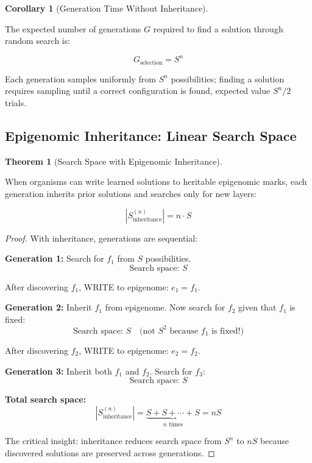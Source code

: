 \documentclass[11pt]{article}
\theoremstyle{definition}
\newtheorem{theorem}{Theorem}
\newtheorem{corollary}{Corollary}
\begin{document}
\begin{corollary}[Generation Time Without Inheritance]
\label{cor:gen-time-selection}

The expected number of generations $G$ required to find a solution through random search is:

\begin{equation}
G_{\text{selection}} = S^n
\end{equation}

Each generation samples uniformly from $S^n$ possibilities; finding a solution requires sampling until a correct configuration is found, expected value $S^n/2$ trials.

\end{corollary}

\subsection{Epigenomic Inheritance: Linear Search Space}

\begin{theorem}[Search Space with Epigenomic Inheritance]
\label{thm:inheritance-space}

When organisms can write learned solutions to heritable epigenomic marks, each generation inherits prior solutions and searches only for new layers:

\begin{equation}
|S^{(n)}_{\text{inheritance}}| = n \cdot S
\end{equation}

\end{theorem}

\begin{proof}
With inheritance, generations are sequential:

\textbf{Generation 1:} Search for $f_1$ from $S$ possibilities.
$$\text{Search space: } S$$

After discovering $f_1$, WRITE to epigenome: $e_1 = f_1$.

\textbf{Generation 2:} Inherit $f_1$ from epigenome. Now search for $f_2$ given that $f_1$ is fixed:
$$\text{Search space: } S \quad \text{(not } S^2 \text{ because } f_1 \text{ is fixed!)}$$

After discovering $f_2$, WRITE to epigenome: $e_2 = f_2$.

\textbf{Generation 3:} Inherit both $f_1$ and $f_2$. Search for $f_3$:
$$\text{Search space: } S$$

\textbf{Total search space:}
$$|S^{(n)}_{\text{inheritance}}| = \underbrace{S + S + \cdots + S}_{n \text{ times}} = nS$$

The critical insight: inheritance reduces search space from $S^n$ to $nS$ because discovered solutions are preserved across generations.
\end{proof}
\end{document}
